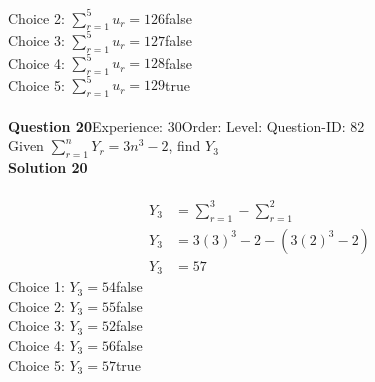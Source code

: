 \documentclass{article}
\begin{document}
Choice 2: \hspace{20pt}$\displaystyle\sum_{r=1}^{5} u_r=126$\hspace{20pt}false\\
Choice 3: \hspace{20pt}$\displaystyle\sum_{r=1}^{5} u_r=127$\hspace{20pt}false\\
Choice 4: \hspace{20pt}$\displaystyle\sum_{r=1}^{5} u_r=128$\hspace{20pt}false\\
Choice 5: \hspace{20pt}$\displaystyle\sum_{r=1}^{5} u_r=129$\hspace{20pt}true\\
\\[4pt]
\noindent\textbf{Question 20}\hspace{20pt}Experience: 30\hspace{20pt}Order: \hspace{20pt}Level: \hspace{20pt}Question-ID: 82\\[2pt]
Given $\displaystyle\sum_{r=1}^{n} Y_r = 3n^3-2$, find $Y_3$\\[4pt]
\noindent\textbf{Solution 20}\\[2pt]
\\[-35pt]\begin{align*}
Y_3&=\displaystyle\sum_{r=1}^{3} - \displaystyle\sum_{r=1}^{2}\\[2pt]
Y_3&=3(3)^3-2 - (3(2)^3-2)\\[2pt]
Y_3&=57
\end{align*}
Choice 1: \hspace{20pt}$Y_3=54$\hspace{20pt}false\\
Choice 2: \hspace{20pt}$Y_3=55$\hspace{20pt}false\\
Choice 3: \hspace{20pt}$Y_3=52$\hspace{20pt}false\\
Choice 4: \hspace{20pt}$Y_3=56$\hspace{20pt}false\\
Choice 5: \hspace{20pt}$Y_3=57$\hspace{20pt}true\\
\\[4pt]
\end{document}
